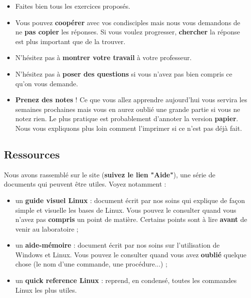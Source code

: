 \documentclass[11pt,a4paper]{article}
\begin{document}
					\begin{itemize}
				
			\item 
					Faites bien tous les exercices propos\'es.
				
			\item 
					Vous pouvez \textbf{coop\'erer} avec vos condisciples 
					mais nous vous demandons de ne \textbf{pas copier} les r\'eponses.
					Si vous voulez progresser,
					\textbf{chercher} la r\'eponse est plus important que de la trouver. 
				
			\item 
					N'h\'esitez pas \`a \textbf{montrer votre travail} \`a votre professeur.
				
			\item 
					N'h\'esitez pas \`a \textbf{poser des questions}
					si vous n'avez pas bien compris ce qu'on vous demande.
				
			\item \textbf{Prenez des notes} !
					Ce que vous allez apprendre aujourd'hui vous servira les semaines prochaines 
					mais vous en aurez oubli\'e une grande partie si vous ne notez rien. 
					Le plus pratique est probablement d'annoter la version \textbf{papier}.
					Nous vous expliquons plus loin comment l'imprimer
					si ce n'est pas d\'ej\`a fait.
				
					\end{itemize}
				\subsection{Ressources}
					Nous avons rassembl\'e sur le site
					(\textbf{suivez le lien "Aide"}), 
					une s\'erie de documents qui peuvent \^etre utiles. Voyez notamment :
				
            \par
        
					\begin{itemize}
				
			\item 
						un \textbf{guide visuel Linux} :
						document \'ecrit par nos soins qui explique de fa\c con simple et visuelle les bases de Linux.
						Vous pouvez le consulter quand vous n'avez pas \textbf{compris} un point de mati\`ere.
						Certains points sont \`a lire \textbf{avant} de venir au laboratoire ;
					
			\item 
						un \textbf{aide-m\'emoire} :
						document \'ecrit par nos soins sur l'utilisation de Windows et Linux.
						Vous pouvez le consulter quand vous avez \textbf{oubli\'e} quelque chose
						(le nom d'une commande, une proc\'edure...) ;
					
			\item 
						un \textbf{quick reference Linux} : reprend, en condens\'e, toutes les commandes Linux les plus utiles. 
					
					\end{itemize}
\end{document}
